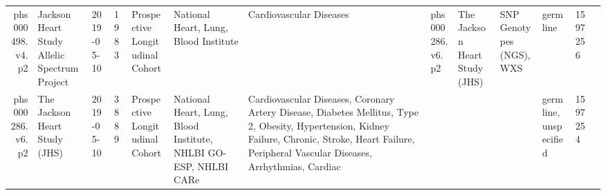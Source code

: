 \documentclass[11pt]{article}
\begin{document}
\begin{tabular}{r|llllllllllll}
	 phs000498.v4.p2                              & Jackson Heart Study Allelic Spectrum Project &  2019-05-10                                  & 1983                                         & Prospective Longitudinal Cohort              & National Heart, Lung, Blood Institute        & Cardiovascular Diseases                      & phs000286.v6.p2                              & The Jackson Heart Study (JHS)                & SNP Genotypes (NGS), WXS                     & germline                                     & 1597256                                     \\
	 phs000286.v6.p2                                                                                                                                                                                        & The Jackson Heart Study (JHS)                                                                                                                                                                          &  2019-05-10                                                                                                                                                                                            & 3889                                                                                                                                                                                                   & Prospective Longitudinal Cohort                                                                                                                                                                        & National Heart, Lung, Blood Institute, NHLBI GO-ESP, NHLBI CARe                                                                                                                                        & Cardiovascular Diseases, Coronary Artery Disease, Diabetes Mellitus, Type 2, Obesity, Hypertension, Kidney Failure, Chronic, Stroke, Heart Failure, Peripheral Vascular Diseases, Arrhythmias, Cardiac &                                                                                                                                                                                                        &                                                                                                                                                                                                        &                                                                                                                                                                                                        & germline, unspecified                                                                                                                                                                                  & 1597254                                                                                                                                                                                               \\

\end{tabular}
\end{document}
